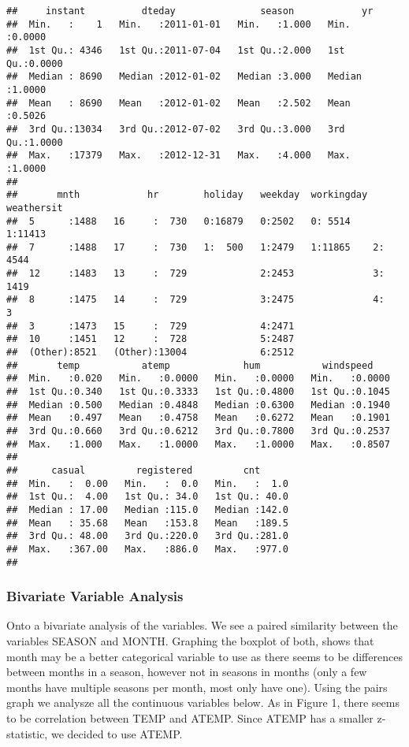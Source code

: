 \documentclass[]{article}
\begin{document}
\begin{verbatim}
##     instant          dteday               season            yr        
##  Min.   :    1   Min.   :2011-01-01   Min.   :1.000   Min.   :0.0000  
##  1st Qu.: 4346   1st Qu.:2011-07-04   1st Qu.:2.000   1st Qu.:0.0000  
##  Median : 8690   Median :2012-01-02   Median :3.000   Median :1.0000  
##  Mean   : 8690   Mean   :2012-01-02   Mean   :2.502   Mean   :0.5026  
##  3rd Qu.:13034   3rd Qu.:2012-07-02   3rd Qu.:3.000   3rd Qu.:1.0000  
##  Max.   :17379   Max.   :2012-12-31   Max.   :4.000   Max.   :1.0000  
##                                                                       
##       mnth            hr        holiday   weekday  workingday weathersit
##  5      :1488   16     :  730   0:16879   0:2502   0: 5514    1:11413   
##  7      :1488   17     :  730   1:  500   1:2479   1:11865    2: 4544   
##  12     :1483   13     :  729             2:2453              3: 1419   
##  8      :1475   14     :  729             3:2475              4:    3   
##  3      :1473   15     :  729             4:2471                        
##  10     :1451   12     :  728             5:2487                        
##  (Other):8521   (Other):13004             6:2512                        
##       temp           atemp             hum           windspeed     
##  Min.   :0.020   Min.   :0.0000   Min.   :0.0000   Min.   :0.0000  
##  1st Qu.:0.340   1st Qu.:0.3333   1st Qu.:0.4800   1st Qu.:0.1045  
##  Median :0.500   Median :0.4848   Median :0.6300   Median :0.1940  
##  Mean   :0.497   Mean   :0.4758   Mean   :0.6272   Mean   :0.1901  
##  3rd Qu.:0.660   3rd Qu.:0.6212   3rd Qu.:0.7800   3rd Qu.:0.2537  
##  Max.   :1.000   Max.   :1.0000   Max.   :1.0000   Max.   :0.8507  
##                                                                    
##      casual         registered         cnt       
##  Min.   :  0.00   Min.   :  0.0   Min.   :  1.0  
##  1st Qu.:  4.00   1st Qu.: 34.0   1st Qu.: 40.0  
##  Median : 17.00   Median :115.0   Median :142.0  
##  Mean   : 35.68   Mean   :153.8   Mean   :189.5  
##  3rd Qu.: 48.00   3rd Qu.:220.0   3rd Qu.:281.0  
##  Max.   :367.00   Max.   :886.0   Max.   :977.0  
## 
\end{verbatim}

\subsubsection{Bivariate Variable
Analysis}\label{bivariate-variable-analysis}

Onto a bivariate analysis of the variables. We see a paired similarity
between the variables SEASON and MONTH. Graphing the boxplot of both,
shows that month may be a better categorical variable to use as there
seems to be differences between months in a season, however not in
seasons in months (only a few months have multiple seasons per month,
most only have one). Using the pairs graph we analysze all the
continuous variables below. As in Figure 1, there seems to be
correlation between TEMP and ATEMP. Since ATEMP has a smaller
z-statistic, we decided to use ATEMP.
\end{document}
